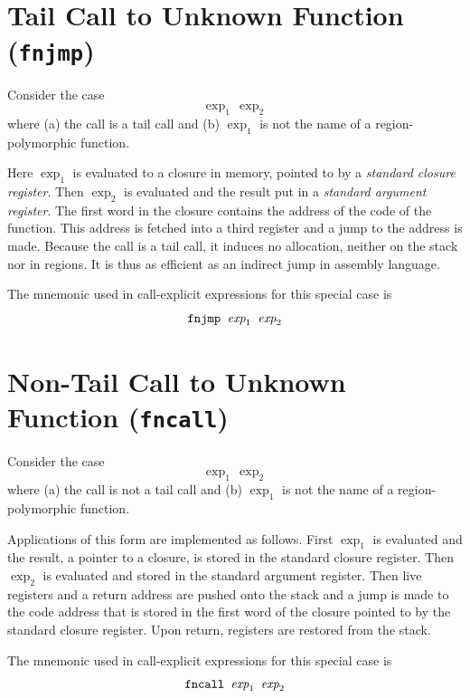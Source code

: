 \documentclass[12pt]{book}
\begin{document}
\section{Tail Call to Unknown Function (\texttt{fnjmp})}
Consider the case
$$\exp_1\,\exp_2$$
where (a) the call is a tail call and (b) $\exp_1$
is not the name of a region-polymorphic function.

Here $\exp_1$ is evaluated to a closure in memory, pointed to by a
%
%
{\em standard closure register}. Then $\exp_2$ is evaluated and the result
put in a
%
%
{\em standard argument register}. The first word in the closure
contains the address of the code of the function. This address is
fetched into a third register and a jump to the address is made.
Because the call is a tail call, it induces no allocation, neither on
the stack nor in regions.  It is thus as efficient as an indirect jump
in assembly language.


The mnemonic used in call-explicit expressions for this special case is
$$\hbox{\tt fnjmp $\hbox{\it exp}_1$ $\hbox{\it exp}_2$}$$

\section{Non-Tail Call to Unknown Function (\texttt{fncall})}
Consider the case
$$\exp_1\,\exp_2$$
where (a) the call is not a tail call and (b)
$\exp_1$ is not the name of a region-polymorphic function.

Applications of this form are implemented as follows. First $\exp_1$
is evaluated and the result, a pointer to a closure, is stored in the
%
%
standard closure register. Then $\exp_2$ is evaluated and stored in
the
%
%
standard argument register.  Then live registers and a return
address are pushed onto the stack and a jump is made to the code
address that is stored in the first word of the closure pointed to by
the standard closure register. Upon return, registers are restored
from the stack.

The mnemonic used in call-explicit expressions for this special case is
$$\hbox{\tt fncall $\hbox{\it exp}_1$ $\hbox{\it exp}_2$}$$
\end{document}
